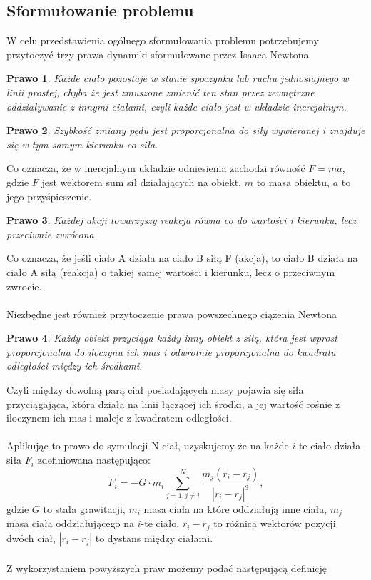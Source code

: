 \documentclass[14pt,twoside,a4paper]{article}
\newtheorem{theorem}{Prawo}
\begin{document}
\subsection{\Large Sformułowanie problemu}
W celu przedstawienia ogólnego sformułowania problemu potrzebujemy przytoczyć trzy prawa dynamiki sformułowane przez Isaaca Newtona \cite{fund}

\begin{theorem}
Każde ciało pozostaje w stanie spoczynku lub ruchu jednostajnego w linii prostej, chyba że jest zmuszone zmienić ten stan przez zewnętrzne oddziaływanie z innymi ciałami, czyli każde ciało jest w układzie inercjalnym.
\end{theorem}

\begin{theorem}
Szybkość zmiany pędu jest proporcjonalna do siły wywieranej i znajduje się w tym samym kierunku co siła.
\end{theorem}
Co oznacza, że w inercjalnym układzie odniesienia zachodzi równość $F=ma$, gdzie $F$ jest wektorem sum sił działających na obiekt, $m$ to masa obiektu, $a$ to jego przyśpieszenie.

\begin{theorem}
Każdej akcji towarzyszy reakcja równa co do wartości i kierunku, lecz przeciwnie zwrócona.
\end{theorem} 
Co oznacza, że jeśli ciało A działa na ciało B siłą F (akcja), to ciało B działa na ciało A siłą (reakcja) o takiej samej wartości i kierunku, lecz o przeciwnym zwrocie.\\~\\


Niezbędne jest również przytoczenie prawa powszechnego ciążenia Newtona \cite{fund}
\begin{theorem}
Każdy obiekt przyciąga każdy inny obiekt z siłą, która jest wprost proporcjonalna do iloczynu ich mas i odwrotnie proporcjonalna do kwadratu odległości między ich środkami.
\end{theorem}
Czyli między dowolną parą ciał posiadających masy pojawia się siła przyciągająca, która działa na linii łączącej ich środki, a jej wartość rośnie z iloczynem ich mas i maleje z kwadratem odległości.\\~\\

Aplikując to prawo do symulacji N ciał, uzyskujemy że na każde $i$-te ciało działa siła $F_i$ zdefiniowana następująco:\\
$$F_i = -G\cdot m_i \sum_{j=1, j\neq i}^N \frac{m_j(r_i - r_j)}{|r_i - r_j|^3},$$gdzie $G$ to stała grawitacji, $m_i$ masa ciała na które oddziałują inne ciała, $m_j$ masa ciała oddziałującego na $i$-te ciało, $r_i - r_j$ to różnica wektorów pozycji dwóch ciał, $|r_i - r_j|$ to dystans między ciałami. \\~\\
Z wykorzystaniem powyższych praw możemy podać następującą definicję
\end{document}
